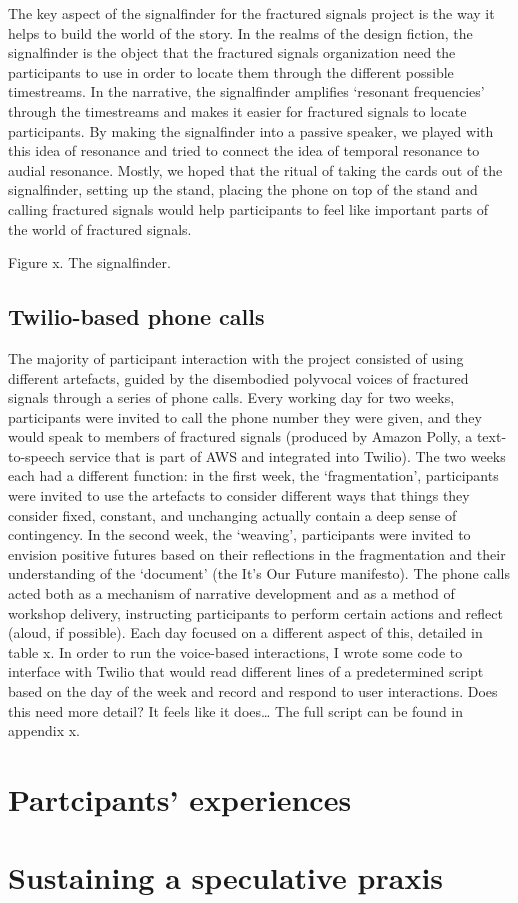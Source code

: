 The key aspect of the signalfinder for the fractured signals project is the way it helps to build the world of the story. In the realms of the design fiction, the signalfinder is the object that the fractured signals organization need the participants to use in order to locate them through the different possible timestreams. In the narrative, the signalfinder amplifies ‘resonant frequencies’ through the timestreams and makes it easier for fractured signals to locate participants. By making the signalfinder into a passive speaker, we played with this idea of resonance and tried to connect the idea of temporal resonance to audial resonance. Mostly, we hoped that the ritual of taking the cards out of the signalfinder, setting up the stand, placing the phone on top of the stand and calling fractured signals would help participants to feel like important parts of the world of fractured signals. 

Figure x. The signalfinder.

\subsection{Twilio-based phone calls}
The majority of participant interaction with the project consisted of using different artefacts, guided by the disembodied polyvocal voices of fractured signals through a series of phone calls. Every working day for two weeks, participants were invited to call the phone number they were given, and they would speak to members of fractured signals (produced by Amazon Polly, a text-to-speech service that is part of AWS and integrated into Twilio). The two weeks each had a different function: in the first week, the ‘fragmentation’, participants were invited to use the artefacts to consider different ways that things they consider fixed, constant, and unchanging actually contain a deep sense of contingency. In the second week, the ‘weaving’, participants were invited to envision positive futures based on their reflections in the fragmentation and their understanding of the ‘document’ (the It’s Our Future manifesto). The phone calls acted both as a mechanism of narrative development and as a method of workshop delivery, instructing participants to perform certain actions and reflect (aloud, if possible). Each day focused on a different aspect of this, detailed in table x.  
In order to run the voice-based interactions, I wrote some code to interface with Twilio that would read different lines of a predetermined script based on the day of the week and record and respond to user interactions. Does this need more detail? It feels like it does… The full script can be found in appendix x.

\section{Partcipants' experiences}

\section{Sustaining a speculative praxis}